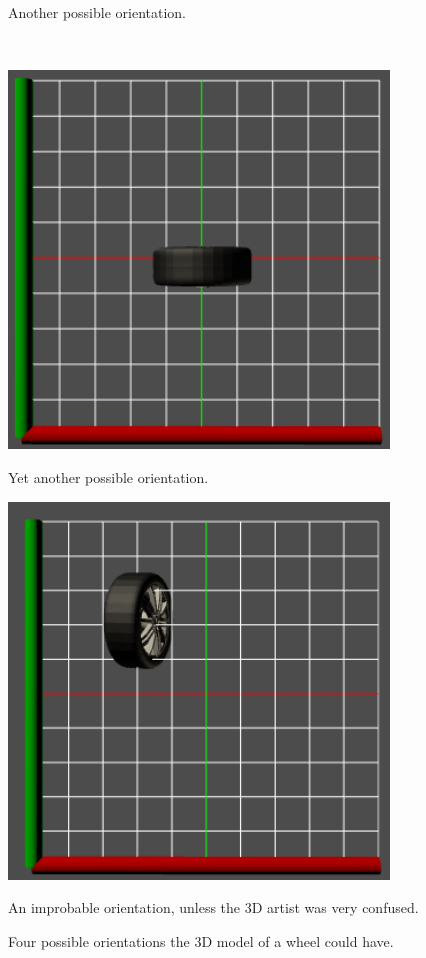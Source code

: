 \begin{figure}
\begin{minipage}{.5\textwidth}
  	\caption{Another possible orientation.}
  	\label{fig:wheel2}
  \end{minipage}\\
  \begin{minipage}{.5\textwidth}
  	\includegraphics[width=0.9\textwidth]{../assets/wheel3.png}
  	\caption{Yet another possible orientation.}
  	\label{fig:wheel3}
  \end{minipage}
  \begin{minipage}{.5\textwidth}
  	\includegraphics[width=0.9\textwidth]{../assets/wheel4.png}
  	\caption{An improbable orientation, unless the 3D artist was very confused.}
  	\label{fig:wheel4}
  \end{minipage}
  \caption*{Four possible orientations the 3D model of a wheel could have.}
\end{figure}

